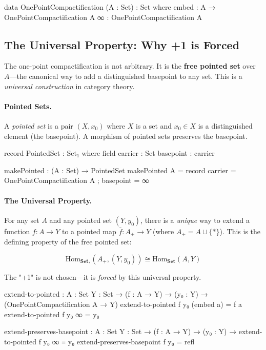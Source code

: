 \documentclass[11pt,a4paper]{book}
\begin{document}
\begin{code}
data OnePointCompactification (A : Set) : Set where
  embed : A → OnePointCompactification A
  ∞     : OnePointCompactification A

\end{code}

\subsection{The Universal Property: Why +1 is Forced}

The one-point compactification is not arbitrary. It is the \textbf{free pointed set} 
over $A$---the canonical way to add a distinguished basepoint to any set. This is a 
\emph{universal construction} in category theory.

\paragraph{Pointed Sets.}
A \emph{pointed set} is a pair $(X, x_0)$ where $X$ is a set and $x_0 \in X$ is a 
distinguished element (the basepoint). A morphism of pointed sets preserves the basepoint.

\begin{code}
record PointedSet : Set₁ where
  field
    carrier   : Set
    basepoint : carrier

makePointed : (A : Set) → PointedSet
makePointed A = record { carrier = OnePointCompactification A ; basepoint = ∞ }
\end{code}

\paragraph{The Universal Property.}
For any set $A$ and any pointed set $(Y, y_0)$, there is a \emph{unique} way to extend 
a function $f : A \to Y$ to a pointed map $\bar{f} : A_+ \to Y$ (where $A_+ = A \sqcup \{*\}$).
This is the defining property of the free pointed set:

\[
\text{Hom}_{\mathbf{Set}_*}(A_+, (Y, y_0)) \cong \text{Hom}_{\mathbf{Set}}(A, Y)
\]

The "+1" is not chosen---it is \emph{forced} by this universal property.

\begin{code}
extend-to-pointed : {A : Set} {Y : Set} → (f : A → Y) → (y₀ : Y) 
                  → (OnePointCompactification A → Y)
extend-to-pointed f y₀ (embed a) = f a
extend-to-pointed f y₀ ∞         = y₀

extend-preserves-basepoint : {A : Set} {Y : Set} → (f : A → Y) → (y₀ : Y) 
                           → extend-to-pointed f y₀ ∞ ≡ y₀
extend-preserves-basepoint f y₀ = refl
\end{code}
\end{document}
